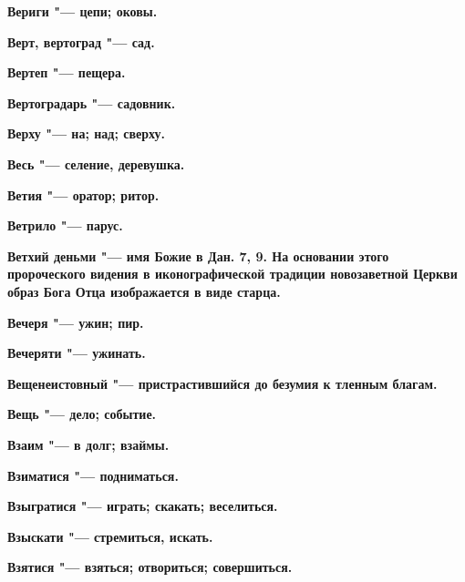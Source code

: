 \begin{multicols}{2}
\bfseries Вериги\normalfont{} "--- цепи; оковы. 




\bfseries Верт, вертоград\normalfont{} "--- сад. 




\bfseries Вертеп\normalfont{} "--- пещера. 




\bfseries Вертоградарь\normalfont{} "--- садовник. 




\bfseries Верху\normalfont{} "--- на; над; сверху. 




\bfseries Весь\normalfont{} "--- селение, деревушка. 




\bfseries Ветия\normalfont{} "--- оратор; ритор. 




\bfseries Ветрило\normalfont{} "--- парус. 




\bfseries Ветхий деньми\normalfont{} "--- имя Божие в Дан. 7, 9. На основании этого пророческого видения в иконографической традиции новозаветной Церкви образ Бога Отца изображается в виде старца. 




\bfseries Вечеря\normalfont{} "--- ужин; пир. 




\bfseries Вечеряти\normalfont{} "--- ужинать. 




\bfseries Вещенеистовный\normalfont{} "--- пристрастившийся до безумия к тленным благам. 




\bfseries Вещь\normalfont{} "--- дело; событие. 




\bfseries Взаим\normalfont{} "--- в долг; взаймы. 




\bfseries Взиматися\normalfont{} "--- подниматься. 




\bfseries Взыгратися\normalfont{} "--- играть; скакать; веселиться. 




\bfseries Взыскати\normalfont{} "--- стремиться, искать. 




\bfseries Взятися\normalfont{} "--- взяться; отвориться; совершиться. 





\end{multicols}
